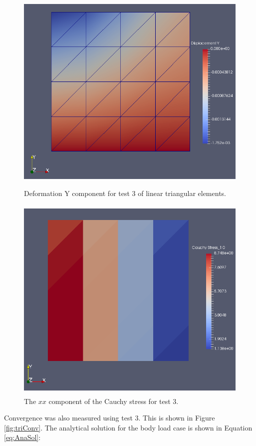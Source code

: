 \documentclass[a4paper, 12pt]{article}
\begin{document}
\begin{figure}[H]
  \centering
  \includegraphics[width=13cm, height=10cm]{tri_4_t3_disp_Y}
  \caption{Deformation Y component for test 3 of linear 
            triangular elements.}
  \label{fig:linTri3_y}
\end{figure}

\begin{figure}[H]
  \centering
  \includegraphics[width=13cm, height=10cm]{tri_4_t3_Sxx}
  \caption{The $xx$ component of the Cauchy stress for test 3.}
  \label{fig:linTri3_SXX}
\end{figure}

Convergence was also measured using test 3. This is shown in 
Figure \ref{fig:triConv}. The analytical solution for the 
body load case is shown in Equation \ref{eq:AnaSol}:
\end{document}
